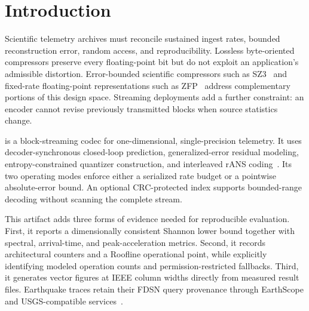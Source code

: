 \section{Introduction}
Scientific telemetry archives must reconcile sustained ingest rates, bounded reconstruction error, random access, and reproducibility. Lossless byte-oriented compressors preserve every floating-point bit but do not exploit an application's admissible distortion. Error-bounded scientific compressors such as SZ3~\cite{liang2022sz3} and fixed-rate floating-point representations such as ZFP~\cite{lindstrom2014zfp} address complementary portions of this design space. Streaming deployments add a further constraint: an encoder cannot revise previously transmitted blocks when source statistics change.

\Aether{} is a block-streaming codec for one-dimensional, single-precision telemetry. It uses decoder-synchronous closed-loop prediction, generalized-error residual modeling, entropy-constrained quantizer construction, and interleaved rANS coding~\cite{duda2013ans}. Its two operating modes enforce either a serialized rate budget or a pointwise absolute-error bound. An optional CRC-protected index supports bounded-range decoding without scanning the complete stream.

This artifact adds three forms of evidence needed for reproducible evaluation. First, it reports a dimensionally consistent Shannon lower bound together with spectral, arrival-time, and peak-acceleration metrics. Second, it records architectural counters and a Roofline operational point, while explicitly identifying modeled operation counts and permission-restricted fallbacks. Third, it generates vector figures at IEEE column widths directly from measured result files. Earthquake traces retain their FDSN query provenance through EarthScope and USGS-compatible services~\cite{fdsnweb,usgsfdsn}.
